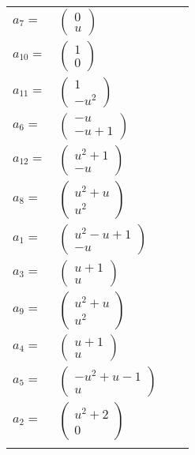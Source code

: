 \documentclass[1p]{elsarticle_modified}
\theoremstyle{definition}
\begin{document}
\begin{tabular}{m{7pt} m{180pt} m{7pt} m{180pt} }
\flushright $a_{7}=$&$\begin{pmatrix}0\\u\end{pmatrix}$ \\
\flushright $a_{10}=$&$\begin{pmatrix}1\\0\end{pmatrix}$ \\
\flushright $a_{11}=$&$\begin{pmatrix}1\\- u^2\end{pmatrix}$ \\
\flushright $a_{6}=$&$\begin{pmatrix}- u\\- u+1\end{pmatrix}$ \\
\flushright $a_{12}=$&$\begin{pmatrix}u^2+1\\- u\end{pmatrix}$ \\
\flushright $a_{8}=$&$\begin{pmatrix}u^2+u\\u^2\end{pmatrix}$ \\
\flushright $a_{1}=$&$\begin{pmatrix}u^2- u+1\\- u\end{pmatrix}$ \\
\flushright $a_{3}=$&$\begin{pmatrix}u+1\\u\end{pmatrix}$ \\
\flushright $a_{9}=$&$\begin{pmatrix}u^2+u\\u^2\end{pmatrix}$ \\
\flushright $a_{4}=$&$\begin{pmatrix}u+1\\u\end{pmatrix}$ \\
\flushright $a_{5}=$&$\begin{pmatrix}- u^2+u-1\\u\end{pmatrix}$ \\
\flushright $a_{2}=$&$\begin{pmatrix}u^2+2\\0\end{pmatrix}$\\&\end{tabular}
\end{document}
